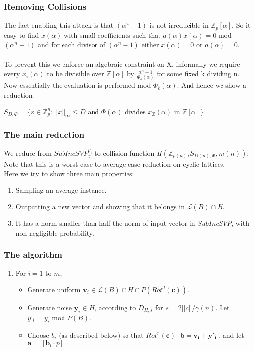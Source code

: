 \documentclass{beamer}
\newcommand{\Latt}{\mathcal{L}}
\begin{document}
\begin{frame}
	\frametitle{Removing Collisions}
	The fact enabling this attack is that $(\alpha^n-1)$ is not irreducible in $\mathbb{Z}_p[\alpha]$. So it easy to find $x(\alpha)$ with small coefficients such that $a(\alpha)x(\alpha) = 0$ mod $(\alpha^n-1)$ and for each divisor of $(\alpha^n-1)$ either $x(\alpha) = 0$ or $a(\alpha) = 0$.
	\\~\\
	To prevent this we enforce an algebraic constraint on X, informally we require every $x_i(\alpha)$ to be divisible over $\mathbb{Z}[\alpha]$ by $\frac{\alpha^n-1}{\Phi_k(\alpha)}$ for some fixed k dividing n. Now essentially the evaluation is performed mod $\Phi_k(\alpha)$. And hence we show a reduction.
	\begin{center}
	$S_{D,\Phi} = \{x \in \mathbb{Z}^n_p : ||x||_\infty \leq D$ and $\Phi(\alpha)$ divides $x_\mathbb{Z}(\alpha)$ in $\mathbb{Z}[\alpha]\}$
	\end{center}
\end{frame}

\begin{frame}
	\frametitle{The main reduction}
	We reduce from $SubIncSVP_\gamma^{\eta_\epsilon}$ to collision function $H(\mathbb{Z}_{p(n)} , S_{D(n),\Phi}, m(n))$. Note that this is a worst case to average case reduction on cyclic lattices.
	\\
	Here we try to show three main properties:
	\begin{enumerate}
		\item Sampling an average instance.
		\item Outputting a new vector and showing that it belongs in $\Latt(B) \cap H$.
		\item It has a norm smaller than half the norm of input vector in $SubIncSVP$, with non negligible probability.
	\end{enumerate}
\end{frame}

\begin{frame}
	\frametitle{The algorithm}
	\begin{enumerate}
	\item For $i = 1$ to $m$,
		\begin{itemize}
			\item Generate uniform $\mathbf{v}_i \in \Latt(B)\cap H \cap P(Rot^d(\mathbf{c}))$. \cite{Micciancio2002}
			\item Generate noise $\mathbf{y}_i \in H$, according to $D_{H,s}$ for $s = 2||c||/\gamma(n)$. Let $y'_i = y_i$ mod $P(B)$.
			\item Choose $b_i$ (as described below) so that $Rot^n(\mathbf{c}) \cdot \mathbf{b} = \mathbf{v_i} + \mathbf{y'_i}$ , and let $\mathbf{a_i} = \lfloor \mathbf{b_i} \cdot p \rceil $
		\end{itemize}	
	\end{enumerate}
\end{frame}
\end{document}
